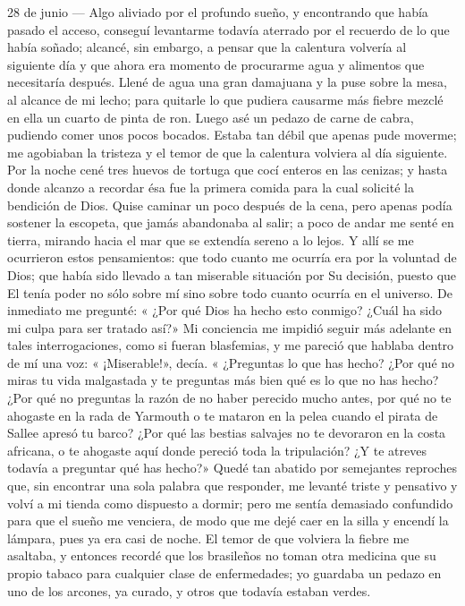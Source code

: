 \documentclass{novela}
\begin{document}
    28 de junio — Algo aliviado por el profundo sueño, y encontrando que había pasado el acceso, conseguí levantarme todavía aterrado por el recuerdo de lo que había soñado; alcancé, sin embargo, a pensar que la calentura volvería al siguiente día y que ahora era momento de procurarme agua y alimentos que necesitaría después. Llené de agua una gran damajuana y la puse sobre la mesa, al alcance de mi lecho; para quitarle lo que pudiera causarme más fiebre mezclé en ella un cuarto de pinta de ron. Luego asé un pedazo de carne de cabra, pudiendo comer unos pocos bocados. Estaba tan débil que apenas pude moverme; me agobiaban la tristeza y el temor de que la calentura volviera al día siguiente. Por la noche cené tres huevos de tortuga que cocí enteros en las cenizas; y hasta donde alcanzo a recordar ésa fue la primera comida para la cual solicité la bendición de Dios.
    Quise caminar un poco después de la cena, pero apenas podía sostener la escopeta, que jamás abandonaba al salir; a poco de andar me senté en tierra, mirando hacia el mar que se extendía sereno a lo lejos. Y allí se me ocurrieron estos pensamientos: que todo cuanto me ocurría era por la voluntad de Dios; que había sido llevado a tan miserable situación por Su decisión, puesto que El tenía poder no sólo sobre mí sino sobre todo cuanto ocurría en el universo. De inmediato me pregunté: « ¿Por qué Dios ha hecho esto conmigo? ¿Cuál ha sido mi culpa para ser tratado así?»
    Mi conciencia me impidió seguir más adelante en tales interrogaciones, como si fueran blasfemias, y me pareció que hablaba dentro de mí una voz: « ¡Miserable!», decía. « ¿Preguntas lo que has hecho? ¿Por qué no miras tu vida malgastada y te preguntas más bien qué es lo que no has hecho? ¿Por qué no preguntas la razón de no haber perecido mucho antes, por qué no te ahogaste en la rada de Yarmouth o te mataron en la pelea cuando el pirata de Sallee apresó tu barco? ¿Por qué las bestias salvajes no te devoraron en la costa africana, o te ahogaste aquí donde pereció toda la tripulación? ¿Y te atreves todavía a preguntar qué has hecho?»
    Quedé tan abatido por semejantes reproches que, sin encontrar una sola palabra que responder, me levanté triste y pensativo y volví a mi tienda como dispuesto a dormir; pero me sentía demasiado confundido para que el sueño me venciera, de modo que me dejé caer en la silla y encendí la lámpara, pues ya era casi de noche. El temor de que volviera la fiebre me asaltaba, y entonces recordé que los brasileños no toman otra medicina que su propio tabaco para cualquier clase de enfermedades; yo guardaba un pedazo en uno de los arcones, ya curado, y otros que todavía estaban verdes.
\end{document}
